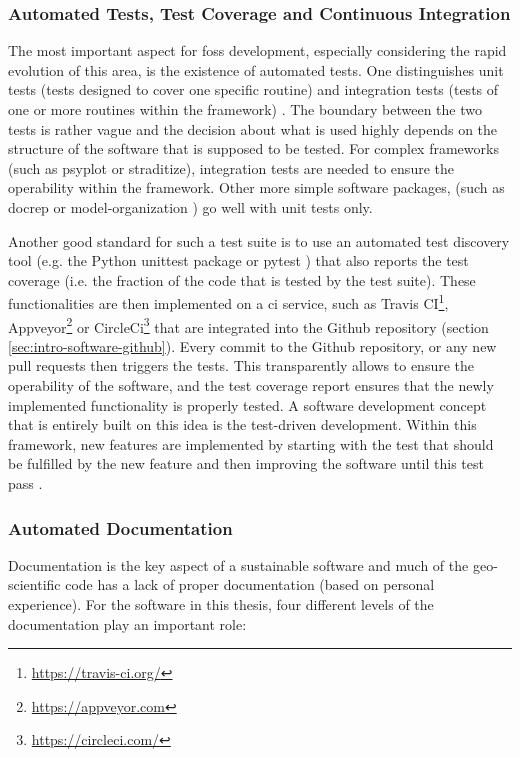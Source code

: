 \begin{refsection}
\subsubsection{Automated Tests, Test Coverage and Continuous Integration} \label{sec:intro-software-ci}
The most important aspect for \gls{foss} development, especially considering the rapid evolution of this area, is the existence of automated tests. One distinguishes unit tests (tests designed to cover one specific routine) and integration tests (tests of one or more routines within the framework) \citep{Shaw2018}. The boundary between the two tests is rather vague and the decision about what is used highly depends on the structure of the software that is supposed to be tested. For complex frameworks (such as psyplot or straditize), integration tests are needed to ensure the operability within the framework. Other more simple software packages, (such as docrep or model-organization \citep{Sommer2018a, Sommer2018b}) go well with unit tests only.

Another good standard for such a test suite is to use an automated test discovery tool (e.g. the Python unittest package \citep{PSF2019} or pytest \citep{KrekelOliveiraPfannschmidtEtAl2004}) that also reports the test coverage (i.e. the fraction of the code that is tested by the test suite). These functionalities are then implemented on a \gls{ci} service, such as Travis CI\footnote{\url{https://travis-ci.org/}}, Appveyor\footnote{\url{https://appveyor.com}} or CircleCi\footnote{\url{https://circleci.com/}} that are integrated into the Github repository (section \ref{sec:intro-software-github}). Every commit to the Github repository, or any new pull requests then triggers the tests. This transparently allows to ensure the operability of the software, and the test coverage report ensures that the newly implemented functionality is properly tested. A software development concept that is entirely built on this idea is the test-driven development. Within this framework, new features are implemented by starting with the test that should be fulfilled by the new feature and then improving the software until this test pass \citep{Beck2002}.


\subsubsection{Automated Documentation} \label{sec:intro-software-docs}
Documentation is the key aspect of a sustainable software and much of the geo-scientific code has a lack of proper documentation (based on personal experience). For the software in this thesis, four different levels of the documentation play an important role:


\end{refsection}
